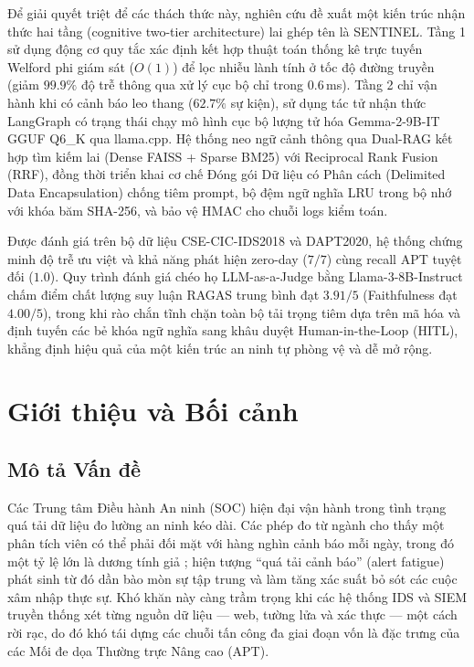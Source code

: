 \documentclass[12pt,a4paper]{article}
\begin{document}
Để giải quyết triệt để các thách thức này, nghiên cứu đề xuất một kiến trúc nhận thức hai tầng (cognitive two-tier architecture) lai ghép tên là SENTINEL. Tầng 1 sử dụng động cơ quy tắc xác định kết hợp thuật toán thống kê trực tuyến Welford phi giám sát ($O(1)$) để lọc nhiễu lành tính ở tốc độ đường truyền (giảm $99.9\%$ độ trễ thông qua xử lý cục bộ chỉ trong $0.6$\,ms). Tầng 2 chỉ vận hành khi có cảnh báo leo thang ($62.7\%$ sự kiện), sử dụng tác tử nhận thức LangGraph có trạng thái chạy mô hình cục bộ lượng tử hóa Gemma-2-9B-IT GGUF Q6\_K qua llama.cpp. Hệ thống neo ngữ cảnh thông qua Dual-RAG kết hợp tìm kiếm lai (Dense FAISS + Sparse BM25) với Reciprocal Rank Fusion (RRF), đồng thời triển khai cơ chế Đóng gói Dữ liệu có Phân cách (Delimited Data Encapsulation) chống tiêm prompt, bộ đệm ngữ nghĩa LRU trong bộ nhớ với khóa băm SHA-256, và bảo vệ HMAC cho chuỗi logs kiểm toán.

Được đánh giá trên bộ dữ liệu CSE-CIC-IDS2018 và DAPT2020, hệ thống chứng minh độ trễ ưu việt và khả năng phát hiện zero-day ($7/7$) cùng recall APT tuyệt đối ($1.0$). Quy trình đánh giá chéo họ LLM-as-a-Judge bằng Llama-3-8B-Instruct chấm điểm chất lượng suy luận RAGAS trung bình đạt $3.91/5$ (Faithfulness đạt $4.00/5$), trong khi rào chắn tĩnh chặn toàn bộ tải trọng tiêm dựa trên mã hóa và định tuyến các bẻ khóa ngữ nghĩa sang khâu duyệt Human-in-the-Loop (HITL), khẳng định hiệu quả của một kiến trúc an ninh tự phòng vệ và dễ mở rộng.

\newpage
\tableofcontents

\newpage
\section{Giới thiệu và Bối cảnh}

\subsection{Mô tả Vấn đề}
Các Trung tâm Điều hành An ninh (SOC) hiện đại vận hành trong tình trạng quá tải dữ liệu đo lường an ninh kéo dài. Các phép đo từ ngành cho thấy một phân tích viên có thể phải đối mặt với hàng nghìn cảnh báo mỗi ngày, trong đó một tỷ lệ lớn là dương tính giả \cite{ponemon2023}; hiện tượng ``quá tải cảnh báo'' (alert fatigue) phát sinh từ đó dần bào mòn sự tập trung và làm tăng xác suất bỏ sót các cuộc xâm nhập thực sự. Khó khăn này càng trầm trọng khi các hệ thống IDS và SIEM truyền thống xét từng nguồn dữ liệu --- web, tường lửa và xác thực --- một cách rời rạc, do đó khó tái dựng các chuỗi tấn công đa giai đoạn vốn là đặc trưng của các Mối đe dọa Thường trực Nâng cao (APT).
\end{document}
